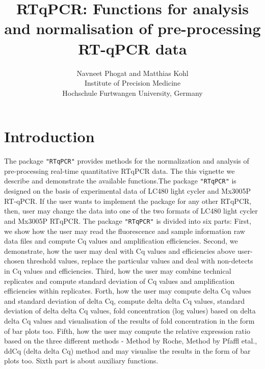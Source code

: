 \documentclass[11pt]{article}
\newcommand{\pkg}[1]{{\tt "#1"}}
\begin{document}



\title{RTqPCR: Functions for analysis and normalisation of pre-processing RT-qPCR data}
\author{Navneet Phogat and Matthias Kohl\\
Institute of Precision Medicine\\
Hochschule Furtwangen University, Germany\medskip\\
}
\maketitle
\tableofcontents
\section{Introduction}
The package \pkg{RTqPCR} provides methods for the normalization and analysis of pre-processing real-time
quantitative RTqPCR data. The this vignette we describe and demonstrate the available functions.The package \pkg{RTqPCR} is designed on the basis of experimental data of LC480 light cycler and Mx3005P RT-qPCR. If the user wants to implement the package for any other RTqPCR, then, user may change the data into one of the two formats
of LC480 light cycler and Mx3005P RTqPCR. The package \pkg{RTqPCR} is divided into six parts:
First, we show how the user may read the fluorescence and sample information raw data files and compute Cq values and amplification efficiencies. Second, we demonstrate, how the user may deal with Cq values and efficiencies above user-chosen threshold values, replace the particular values and deal with non-detects in Cq values and 
efficiencies. Third, how the user may combine technical replicates and compute standard deviation of
Cq values and amplification efficiencies within replicates. Forth, how the user may compute delta Cq values and standard deviation of delta Cq, compute delta delta Cq values, standard deviation of delta delta Cq values, fold concentration (log values) based on delta delta Cq values and visualisation of the results of fold concentration in the form of bar plots too. Fifth, how the user may compute the relative expression ratio based on the three different methods - Method by Roche, Method by Pfaffl etal., ddCq (delta delta Cq) method and may visualise the results in the form of bar plots too. Sixth part is about auxiliary functions.
\end{document}
